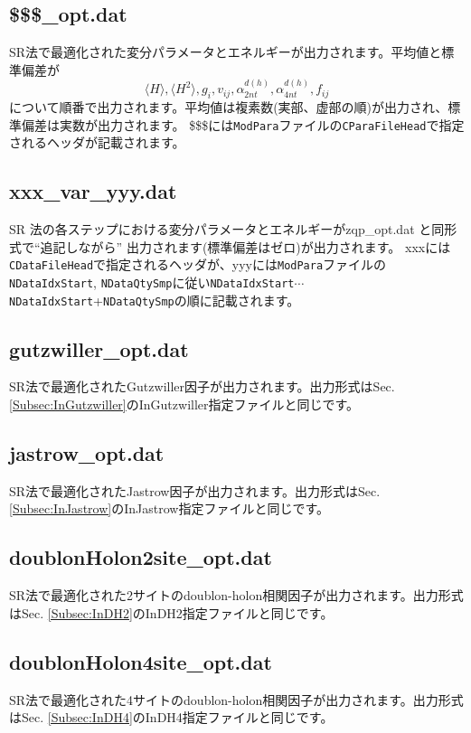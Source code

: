 \subsection{\$\$\$\_opt.dat}
SR法で最適化された変分パラメータとエネルギーが出力されます。平均値と標準偏差が
\begin{equation}
\langle H \rangle, \langle H^2 \rangle, g_i, v_{ij}, \alpha_{2nt}^{d(h)}, \alpha_{4nt}^{d(h)}, f_{ij} \nonumber
\end{equation}
について順番で出力されます。平均値は複素数(実部、虚部の順)が出力され、標準偏差は実数が出力されます。
\$\$\$には\verb|ModPara|ファイルの\verb|CParaFileHead|で指定されるヘッダが記載されます。

\subsection{xxx\_var\_yyy.dat}
SR 法の各ステップにおける変分パラメータとエネルギーがzqp\_opt.dat と同形式で“追記しながら” 出力されます(標準偏差はゼロ)が出力されます。
xxxには\verb|CDataFileHead|で指定されるヘッダが、yyyには\verb|ModPara|ファイルの\verb|NDataIdxStart|, \verb|NDataQtySmp|に従い\verb|NDataIdxStart|$\cdots$\verb|NDataIdxStart|+\verb|NDataQtySmp|の順に記載されます。

\subsection{gutzwiller\_opt.dat}
SR法で最適化されたGutzwiller因子が出力されます。出力形式はSec. \ref{Subsec:InGutzwiller}のInGutzwiller指定ファイルと同じです。

\subsection{jastrow\_opt.dat}
SR法で最適化されたJastrow因子が出力されます。出力形式はSec. \ref{Subsec:InJastrow}のInJastrow指定ファイルと同じです。

\subsection{doublonHolon2site\_opt.dat}
SR法で最適化された2サイトのdoublon-holon相関因子が出力されます。出力形式はSec. \ref{Subsec:InDH2}のInDH2指定ファイルと同じです。

\subsection{doublonHolon4site\_opt.dat}
SR法で最適化された4サイトのdoublon-holon相関因子が出力されます。出力形式はSec. \ref{Subsec:InDH4}のInDH4指定ファイルと同じです。

